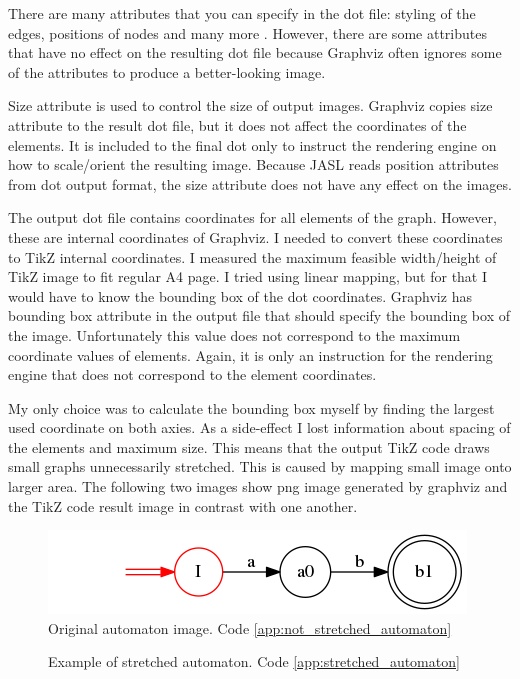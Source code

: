 \documentclass{ctuthesis}
\begin{document}
There are many attributes that you can specify in the dot file: styling of the edges, positions of nodes and many more \cite{dot-notation}. However, there are some attributes that have no effect on the resulting dot file because Graphviz often ignores some of the attributes to produce a better-looking image.

Size attribute is used to control the size of output images. Graphviz copies size attribute to the result dot file, but it does not affect the coordinates of the elements. It is included to the final dot only to instruct the rendering engine on how to scale/orient the resulting image. Because JASL reads position attributes from dot output format, the size attribute does not have any effect on the images.

The output dot file contains coordinates for all elements of the graph. However, these are internal coordinates of Graphviz. I needed to convert these coordinates to TikZ internal coordinates. I measured the maximum feasible width/height of TikZ image to fit regular A4 page. I tried using linear mapping, but for that I would have to know the bounding box of the dot coordinates. Graphviz has bounding box attribute in the output file that should specify the bounding box of the image. Unfortunately this value does not correspond to the maximum coordinate values of elements. Again, it is only an instruction for the rendering engine that does not correspond to the element coordinates.

My only choice was to calculate the bounding box myself by finding the largest used coordinate on both axies. As a side-effect I lost information about spacing of the elements and maximum size. This means that the output TikZ code draws small graphs unnecessarily stretched. This is caused by mapping small image onto larger area. The following two images show png image generated by graphviz and the TikZ code result image in contrast with one another. 

\begin{figure}[H]
\includegraphics[width=0.5\linewidth]{figures/not_stretched.png}
\caption{Original automaton image. Code \ref{app:not_stretched_automaton}}
\label{fig:not_stretched_automaton}
\end{figure}

\begin{figure}[H]
\caption{Example of stretched automaton. Code \ref{app:stretched_automaton}}
\label{fig:stretched_automaton}
\end{figure}
\end{document}
